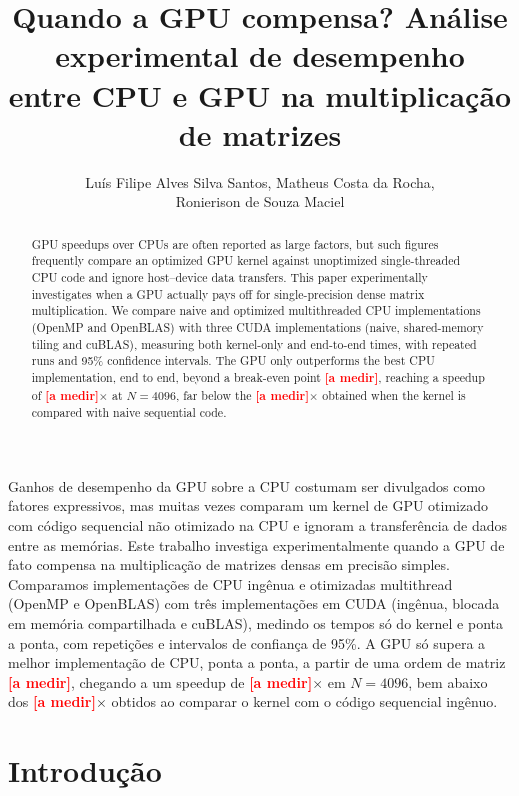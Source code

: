 \documentclass[12pt]{article}
\title{Quando a GPU compensa? Análise experimental de desempenho\\
entre CPU e GPU na multiplicação de matrizes}
\author{Luís Filipe Alves Silva Santos\inst{1}, Matheus Costa da Rocha\inst{1},\\
Ronierison de Souza Maciel\inst{1}}
\newcommand{\pendente}{\textbf{\textcolor{red}{[a medir]}}}
\newcommand{\breakeven}{\pendente}
\newcommand{\breakevenEn}{\pendente}
\newcommand{\speedupEteMax}{\pendente}
\newcommand{\nMax}{4096}
\newcommand{\speedupSeqKernel}{\pendente}
\begin{document}
\maketitle

\begin{abstract}
GPU speedups over CPUs are often reported as large factors, but such figures
frequently compare an optimized GPU kernel against unoptimized single-threaded
CPU code and ignore host--device data transfers. This paper experimentally
investigates when a GPU actually pays off for single-precision dense matrix
multiplication. We compare naive and optimized multithreaded CPU
implementations (OpenMP and OpenBLAS) with three CUDA implementations (naive,
shared-memory tiling and cuBLAS), measuring both kernel-only and end-to-end
times, with repeated runs and 95\% confidence intervals. The GPU only
outperforms the best CPU implementation, end to end, beyond a break-even point
\breakevenEn{}, reaching a speedup of \speedupEteMax$\times$ at
$N=\nMax$, far below the \speedupSeqKernel$\times$ obtained when the kernel is
compared with naive sequential code.
\end{abstract}

\begin{resumo}
Ganhos de desempenho da GPU sobre a CPU costumam ser divulgados como fatores
expressivos, mas muitas vezes comparam um kernel de GPU otimizado com código
sequencial não otimizado na CPU e ignoram a transferência de dados entre as
memórias. Este trabalho investiga experimentalmente quando a GPU de fato
compensa na multiplicação de matrizes densas em precisão simples. Comparamos
implementações de CPU ingênua e otimizadas multithread (OpenMP e OpenBLAS) com
três implementações em CUDA (ingênua, blocada em memória compartilhada e
cuBLAS), medindo os tempos só do kernel e ponta a ponta, com repetições e
intervalos de confiança de 95\%. A GPU só supera a melhor implementação de
CPU, ponta a ponta, a partir de uma ordem de matriz \breakeven, chegando a um
speedup de \speedupEteMax$\times$ em $N=\nMax$, bem abaixo dos
\speedupSeqKernel$\times$ obtidos ao comparar o kernel com o código sequencial
ingênuo.
\end{resumo}

\section{Introdução}
\end{document}
